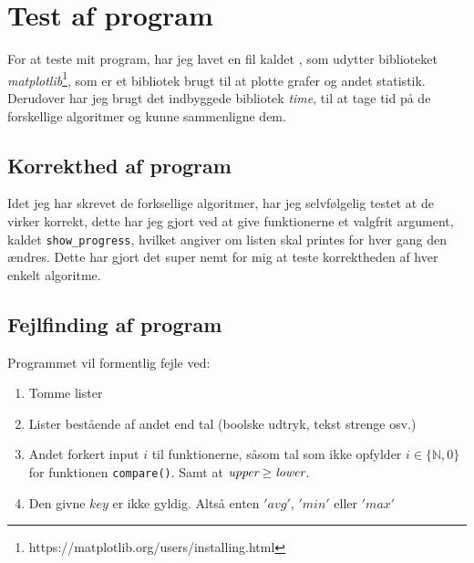 \documentclass[12pt]{article}
\begin{document}
    \section{Test af program}
    For at teste mit program, har jeg lavet en fil kaldet , som udytter biblioteket \emph{matplotlib}\footnote{https://matplotlib.org/users/installing.html}, som er et bibliotek brugt til at plotte grafer og andet statistik.
    Derudover har jeg brugt det indbyggede bibliotek \emph{time}, til at tage tid på de forskellige algoritmer og kunne sammenligne dem.

        \subsection{Korrekthed af program}
        Idet jeg har skrevet de forksellige algoritmer, har jeg selvfølgelig testet at de virker korrekt, dette har jeg gjort ved at give funktionerne et valgfrit argument, kaldet \texttt{show\_progress}, hvilket angiver om listen skal printes for hver gang den ændres.
        Dette har gjort det super nemt for mig at teste korrektheden af hver enkelt algoritme.


        \subsection{Fejlfinding af program}
        Programmet vil formentlig fejle ved:
        \begin{enumerate}
            \item Tomme lister
            \item Lister bestående af andet end tal (boolske udtryk, tekst strenge osv.)
            \item Andet forkert input $i$ til funktionerne, såsom tal som ikke opfylder $i \in \{\mathbb{N}, 0\}$ for funktionen \texttt{compare()}. Samt at $\emph{upper} \geq \emph{lower}$.
            \item Den givne $key$ er ikke gyldig. Altså enten $'avg'$, $'min'$ eller $'max'$
        \end{enumerate}
\end{document}
